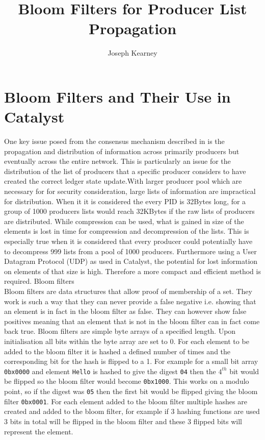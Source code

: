 \documentclass{article}
\title{Bloom Filters for Producer List Propagation}
\author{Joseph Kearney}
\begin{document}
\maketitle

\section{Bloom Filters and Their Use in Catalyst}

One key issue posed from the consensus mechanism described in \cite{TWP} is the propagation and distribution of information across primarily producers but eventually across the entire network. This is particularly an issue for the distribution of the list of producers   that a specific producer considers to have created the correct ledger state update.With larger producer pool which are necessary for for security consideration, large lists of information are impractical for distribution. When it it is considered the every PID is 32Bytes long, for a group of 1000 producers lists would reach 32KBytes if the raw lists of producers are distributed. While compression can be used, what is gained in size of the elements is lost in time for compression and decompression of the lists. This is especially true when it is considered that every producer could potentially have to decompress 999 lists from a pool of 1000 producers. Furthermore using a User Datagram Protocol (UDP) as used in Catalyst, the potential for lost information on elements of that size is high. Therefore a more compact and efficient method is required. Bloom filters \\

Bloom filters are data structures that allow proof of membership of a set. They work is such a way that they can never provide a false negative i.e. showing that an element is in fact in the bloom filter as false. They can however show false positives meaning that an element that is not in the bloom filter can in fact come back true. Bloom filters are simple byte arrays of a specified length. Upon initialisation all bits within the byte array are set to 0. For each element to be added to the bloom filter it is hashed a defined number of times and the corresponding bit for the hash is flipped to a 1. For example for a small bit array \verb'0bx0000' and element \verb'Hello' is hashed to give the digest \verb'04' then the $4^{th}$ bit would be flipped so the bloom filter would become \verb'0bx1000'. This works on a modulo point, so if the digest was \verb'05' then the first bit would be flipped giving the bloom filter \verb'0bx0001'. For each element added to the bloom filter multiple hashes are created and added to the bloom filter, for example if 3 hashing functions are used 3 bits in total will be flipped in the bloom filter and these 3 flipped bits will represent the element. \\
\end{document}
